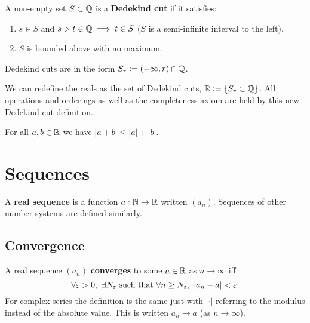 \documentclass[../Year1.tex]{subfiles}
\begin{document}
\begin{definition}
    A non-empty set $S\subset\QQ$ is a \textbf{Dedekind cut} if it satisfies: \begin{enumerate}
        \item $s\in S$ and $s>t\in\QQ \implies t\in S$ ($S$ is a semi-infinite interval to the left),
        \item $S$ is bounded above with no maximum.
    \end{enumerate} Dedekind cuts are in the form $S_r:=(-\infty,r)\cap\QQ$.
\end{definition}

\begin{theorem}
    We can redefine the reals as the set of Dedekind cuts, $\RR:= \{S_r\subset\QQ\}$. All operations and orderings as well as the completeness axiom are held by this new Dedekind cut definition.
\end{theorem}

\begin{theorem}
    For all $a,b\in\RR$ we have $|a+b|\leq |a|+|b|$.
\end{theorem}

\section{Sequences}

\begin{definition}
    A \textbf{real sequence} is a function $a:\NN\rightarrow\RR$ written $(a_n)$. Sequences of other number systems are defined similarly.
\end{definition}

\subsection{Convergence}

\begin{definition}
    A real sequence $(a_n)$ \textbf{converges} to some $a\in\RR$  as $n\rightarrow\infty$ iff \[
    \forall \epsilon>0, \  \exists N_\epsilon \ \text{\textcolor{black}{such that }} \forall n\geq N_\epsilon, \ |a_n-a|<\epsilon
    \textcolor{black}{.}
    \] For complex series the definition is the same just with $|\cdot|$ referring to the modulus instead of the absolute value. This is written $a_n\rightarrow a$ (as $n\rightarrow\infty$).
\end{definition}
\end{document}
